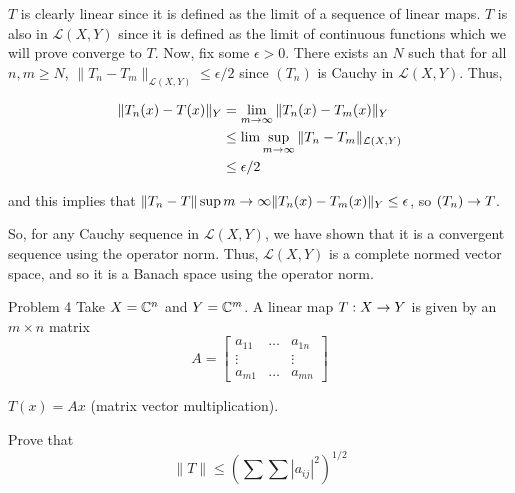 \documentclass{hmwk}
\begin{document}
\begin{solution}
\pre $T$ is clearly linear since it is defined as the limit of a sequence of linear maps. $T$ is also in $\mathcal{L}(X, Y)$ since it is defined as the limit of continuous functions which we will prove converge to $T$. Now, fix some $\epsilon > 0$. There exists an $N$ such that for all $n, m \geq N$, $\|T_n - T_m\|_{\mathcal{L}(X, Y)} \leq \epsilon/2$ since $(T_n)$ is Cauchy in $\mathcal{L}(X, Y)$. Thus, 

\begin{align*}
    \|T_n(x) - T(x)\|_Y &= \lim_{m \rightarrow\infty}\|T_n(x) - T_m(x)\|_Y \\
    &\leq \lim\sup_{m\rightarrow\infty}\|T_n - T_m\|_{\mathcal{L}(X, Y)} \\
    &\leq \epsilon/2
\end{align*}

\pre and this implies that $\|T_n - T\| \sup{m \rightarrow\infty}\|T_n(x) - T_m(x)\|_Y \leq \epsilon$, so $(T_n) \rightarrow T$. 

\pre So, for any Cauchy sequence in $\mathcal{L}(X, Y)$, we have shown that it is a convergent sequence using the operator norm. Thus, $\mathcal{L}(X, Y)$ is a complete normed vector space, and so it is a Banach space using the operator norm.
\end{solution}

\begin{problem}{Problem 4}
Take $X = \mathbb{C}^n$ and $Y = \mathbb{C}^m$. A linear map $T: X \rightarrow Y$ is given by an $m \times n$ matrix 
$$A = \begin{bmatrix}
    a_{11} & \dots & a_{1n} \\
    \vdots &  & \vdots \\
    a_{m1} & \dots & a_{mn}
\end{bmatrix}$$

\pre $T(x) = Ax$ (matrix vector multiplication).

\pre Prove that $$\|T\| \leq \left(\sum \sum|a_{ij}|^2\right)^{1/2}$$
\end{problem}
\end{document}
